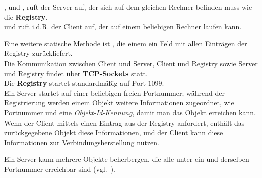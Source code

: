 \begin{tcolorbox}[enlarge top by=0.5cm,enlarge bottom by=0.5cm]
    ,  und , ruft der Server auf, der sich auf dem gleichen Rechner befinden muss wie die \textbf{Registry}.\\
    \noindent
     und  ruft i.d.R. der Client auf, der auf einem beliebigen Rechner laufen kann.
\end{tcolorbox}

\noindent
Eine weitere statische Methode ist , die einem ein Feld mit allen Einträgen der Registry zurückliefert.\\

\noindent
Die Kommunikation zwischen \ul{Client und Server}, \ul{Client und Registry} sowie \ul{Server und Registry} findet über \textbf{TCP-Sockets} statt.\\

\noindent
Die \textbf{Registry} startet standardmäßig auf Port $1099$.\\

\noindent
Ein Server startet auf einer beliebigen freien Portnummer; während der Registrierung werden einem Objekt weitere Informationen zugeordnet, wie Portnummer und eine \textit{Objekt-Id-Kennung}, damit man das Objekt erreichen kann.\\
Wenn der Client mittels  einen Eintrag aus der Registry anfordert, enthält das zurückgegebene Objekt diese Informationen, und der Client kann diese Informationen zur Verbindungsherstellung nutzen.

\begin{tcolorbox}[enlarge top by=0.5cm,enlarge bottom by=0.5cm]
    Ein Server kann mehrere Objekte beherbergen, die alle unter ein und derselben Portnummer erreichbar sind (vgl.~\cite[324]{Oec22}).
\end{tcolorbox}

